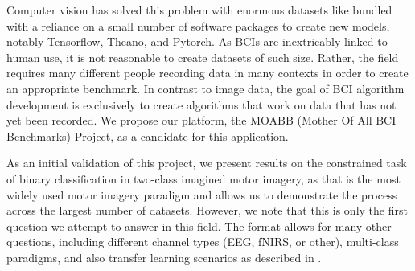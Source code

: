 Computer vision has solved this problem with enormous datasets like
\cite{Deng2009} bundled with a reliance on a small number of software
packages to create new models, notably Tensorflow, Theano, and
Pytorch. As BCIs are inextricably linked to human use, it is not
reasonable to create datasets of such size. Rather, the field requires
many different people recording data in many contexts in order to
create an appropriate benchmark. In contrast to image data, the goal
of BCI algorithm development is exclusively to create algorithms that
work on data that has not yet been recorded. We propose our platform, the MOABB
(Mother Of All BCI Benchmarks) Project, as a candidate for this application. 

As an initial validation of this project, we present results on the
constrained task of binary classification in two-class imagined motor
imagery, as that is the most widely used motor imagery paradigm and
allows us to demonstrate the process across the largest number of
datasets.  However, we note that this is only the first question we
attempt to answer in this field. The format allows for many other questions,
including different channel types (EEG, fNIRS, or other), multi-class
paradigms, and also transfer learning scenarios as described in
\cite{Jayaram2016}. 

